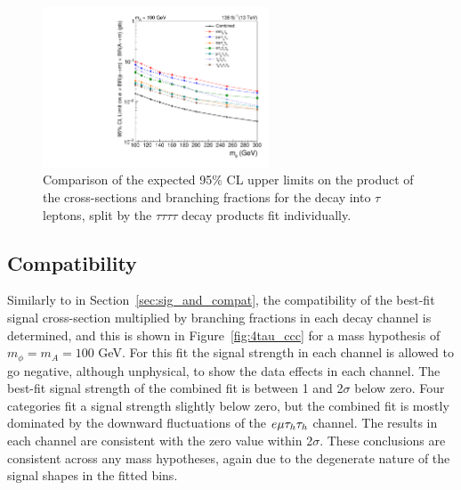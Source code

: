 \begin{figure}[!hbtp]
\centering
    \includegraphics[width=0.6\textwidth]{Figures/limit_comparison_4tau.pdf}
\caption[Plot of the expected model-independent limits split by the $\tau\tau\tau\tau$ decay channels.]{Comparison of the expected 95\% CL upper limits on the product of the cross-sections and branching fractions for the decay into $\tau$ leptons, split by the $\tau\tau\tau\tau$ decay products fit individually.}
\label{fig:4tau_limit_comparison}
\end{figure}

\subsection{Compatibility}

Similarly to in Section~\ref{sec:sig_and_compat}, the compatibility of the best-fit signal cross-section multiplied by branching fractions in each decay channel is determined, and this is shown in Figure~\ref{fig:4tau_ccc} for a mass hypothesis of $m_{\phi}=m_{A}=100$ GeV.
For this fit the signal strength in each channel is allowed to go negative, although unphysical, to show the data effects in each channel.
The best-fit signal strength of the combined fit is between 1 and 2$\sigma$ below zero.
Four categories fit a signal strength slightly below zero, but the combined fit is mostly dominated by the downward fluctuations of the $e\mu\tau_{h}\tau_{h}$ channel.
The results in each channel are consistent with the zero value within 2$\sigma$.
These conclusions are consistent across any mass hypotheses, again due to the degenerate nature of the signal shapes in the fitted bins.

